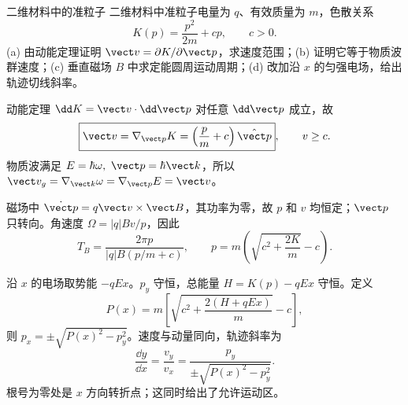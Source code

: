 \begin{practicebox}{二维材料中的准粒子}
二维材料中准粒子电量为 $q$、有效质量为 $m$，色散关系
\[
 K(p)=\frac{p^2}{2m}+cp,\qquad c>0.
\]
(a) 由动能定理证明 $\vect v=\partial K/\partial\vect p$，求速度范围；(b) 证明它等于物质波群速度；(c) 垂直磁场 $B$ 中求定能圆周运动周期；(d) 改加沿 $x$ 的匀强电场，给出轨迹切线斜率。
\label{r2ch03:pr:018}
\begin{solution}
动能定理 $\dd K=\vect v\cdot\dd\vect p$ 对任意 $\dd\vect p$ 成立，故
\[
 \boxed{\vect v=\nabla_{\vect p}K=
 \left(\frac pm+c\right)\hat{\vect p}},\qquad v\ge c.
\]
物质波满足 $E=\hbar\omega,\ \vect p=\hbar\vect k$，所以
$\vect v_g=\nabla_{\vect k}\omega=\nabla_{\vect p}E=\vect v$。

磁场中 $\dot{\vect p}=q\vect v\times\vect B$，其功率为零，故 $p$ 和 $v$ 均恒定；$\vect p$ 只转向。角速度
$\Omega=|q|Bv/p$，因此
\[
 \boxed{T_B=\frac{2\pi p}{|q|B(p/m+c)}},\qquad
 p=m\left(\sqrt{c^2+\frac{2K}{m}}-c\right).
\]

沿 $x$ 的电场取势能 $-qEx$。$p_y$ 守恒，总能量
$H=K(p)-qEx$ 守恒。定义
\[
 P(x)=m\left[\sqrt{c^2+\frac{2(H+qEx)}m}-c\right],
\]
则 $p_x=\pm\sqrt{P(x)^2-p_y^2}$。速度与动量同向，轨迹斜率为
\[
 \boxed{\frac{\dd y}{\dd x}=\frac{v_y}{v_x}
 =\frac{p_y}{\pm\sqrt{P(x)^2-p_y^2}}}.
\]
根号为零处是 $x$ 方向转折点；这同时给出了允许运动区。
\end{solution}
\end{practicebox}
